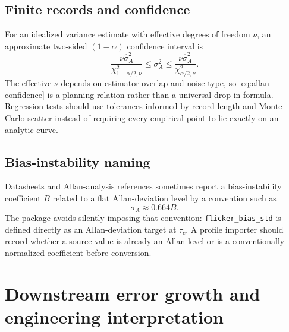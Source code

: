 \documentclass[11pt,oneside,headings=big]{scrreprt}
\newcommand{\field}[1]{\texttt{#1}}
\begin{document}
    \section{Finite records and confidence}
    For an idealized variance estimate with effective degrees of freedom \(\nu\), an
    approximate two-sided \((1-\alpha)\) confidence interval is
    \begin{equation}
        \frac{\nu\widehat\sigma_A^2}
        {\chi^2_{1-\alpha/2,\nu}}
        \le \sigma_A^2\le
        \frac{\nu\widehat\sigma_A^2}
        {\chi^2_{\alpha/2,\nu}}.
        \label{eq:allan-confidence}
    \end{equation}
    The effective \(\nu\) depends on estimator overlap and noise type, so
    \cref{eq:allan-confidence} is a planning relation rather than a universal drop-in
    formula. Regression tests should use tolerances informed by record length and
    Monte Carlo scatter instead of requiring every empirical point to lie exactly on
    an analytic curve.


    \section{Bias-instability naming}
    Datasheets and Allan-analysis references sometimes report a bias-instability
    coefficient \(B\) related to a flat Allan-deviation level by a convention such as
    \begin{equation}
        \sigma_A\approx0.664 B.
    \end{equation}
    The package avoids silently imposing that convention:
    \field{flicker\_bias\_std} is defined directly as an Allan-deviation target at
    \(\tau_c\). A profile importer should record whether a source value is already an
    Allan level or is a conventionally normalized coefficient before conversion.


    \chapter{Downstream error growth and engineering interpretation}
    \label{chap:propagation}
\end{document}
